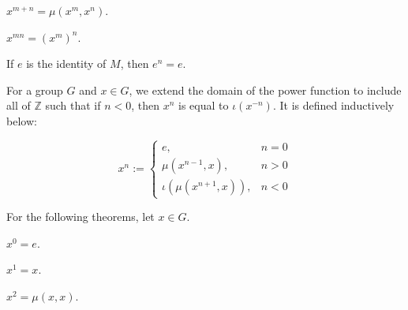 \begin{theorem}
    \label{theorem : mpow_add}
    \leanok
    $x^{m+n} = \mu(x^m,x^n)$.
\end{theorem}

\begin{theorem}
    \label{theorem : mpow_mul}
    \leanok
    $x^{mn} = (x^m)^n$.
\end{theorem}

\begin{theorem}
    \label{theorem : mpow_id}
    \leanok
    If $e$ is the identity of $M$, then $e^n = e$.
\end{theorem}

\begin{definition}
    \label{definition : gpow}
    \leanok
    For a group $G$ and $x \in G$, we extend the domain of the power function to include all of $\mathbb{Z}$ such that if $n < 0$, then $x^n$ is equal to $\iota(x^{-n})$. It is defined inductively below:

    \begin{equation*}
        x^n := \begin{cases}
            e, & n = 0 \\
            \mu(x^{n-1}, x), & n > 0 \\
            \iota(\mu(x^{n+1}, x)), & n < 0
        \end{cases}
    \end{equation*}
\end{definition}

For the following theorems, let $x \in G$.

\begin{theorem}
    \label{theorem : gpow_zero}
    \leanok
    $x^0 = e$.
\end{theorem}

\begin{theorem}
    \label{theorem : gpow_one}
    \leanok
    $x^1 = x$.
\end{theorem}

\begin{theorem}
    \label{theorem : gpow_two}
    \leanok
    $x^2 = \mu(x,x)$.
\end{theorem}

